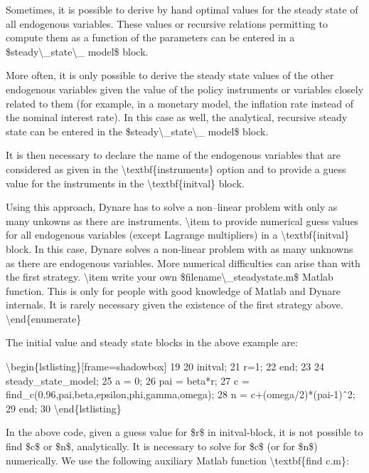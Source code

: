 \documentclass[10pt,math=newtx,citestyle=gb7714-2015,bibstyle=gb7714-2015]{elegantbook}
\begin{document}
	Sometimes, it is possible to derive by hand optimal values for the steady state of all endogenous variables. These values or recursive relations permitting to compute them as a function of the parameters can be entered in a \$steady\textbackslash{}\_state\textbackslash{}\_ model\$ block.
	
	More often, it is only possible to derive the steady state values of the other endogenous variables given the value of the policy instruments or variables closely related to them (for example, in a monetary model, the inflation rate instead of the nominal interest rate). In this case as well, the analytical, recursive steady state can be entered in the \$steady\textbackslash{}\_state\textbackslash{}\_ model\$ block.
	
	It is then necessary to declare the name of the endogenous variables that are considered as given in the \textbackslash{}textbf\{instruments\} option and to provide a guess value for the instruments in the \textbackslash{}textbf\{initval\} block. 
	
	Using this approach, Dynare has to solve a non–linear problem with only as many unkowns as there are instruments.
	\textbackslash{}item to provide numerical guess values for all endogenous variables (except Lagrange multipliers) in a \textbackslash{}textbf\{initval\} block. In this case, Dynare solves a non-linear problem with as many unknowns as there are endogenous variables. More numerical difficulties can arise than with the first strategy.
	\textbackslash{}item write your own \$filename\textbackslash{}\_steadystate.m\$ Matlab function. This is only for people with good knowledge of Matlab and Dynare internals. It is rarely necessary given the existence of the first strategy above.
	\textbackslash{}end\{enumerate\}
	
	The initial value and steady state blocks in the above example are:
	
	\textbackslash{}begin\{lstlisting\}[frame=shadowbox]
	19
	20 initval;
	21 r=1;
	22 end;
	23 
	24 steady\_state\_model;
	25 a = 0;
	26 pai = beta*r;
	27 c = find\_c(0.96,pai,beta,epsilon,phi,gamma,omega);
	28 n = c+(omega/2)*(pai-1)ˆ2;
	29 end;
	30
	\textbackslash{}end\{lstlisting\}
	
	In the above code, given a guess value for \$r\$ in initval-block, it is not possible to find \$c\$ or \$n\$, analytically. It is necessary to solve for \$c\$ (or for \$n\$) numerically. We use the following auxiliary Matlab function \textbackslash{}textbf\{find c.m\}:
	
\end{document}
